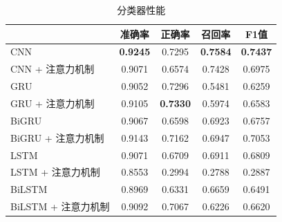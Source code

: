\begin{table}[htb]
  \centering
  \begin{minipage}[t]{0.8\linewidth}
  \caption{分类器性能}
  \label{tab:exp_context_emo_0_result}
    \begin{tabularx}{\linewidth}{X|cccc}
    \toprule[1.5pt]
    & 准确率 & 正确率 & 召回率 & F1值 \\
    \hline
    CNN & \bf 0.9245 & 0.7295 & \bf 0.7584 & \bf 0.7437 \\ %
    CNN + 注意力机制 & 0.9071 & 0.6574 & 0.7428 & 0.6975 \\ %
    \hline
    GRU & 0.9052 & 0.7296 & 0.5481 & 0.6259 \\ %
    GRU + 注意力机制 & 0.9105 & \bf 0.7330 & 0.5974 & 0.6583 \\ %
    \hline
    BiGRU & 0.9067 & 0.6598 & 0.6923 & 0.6757 \\ %
    BiGRU + 注意力机制 & 0.9143 & 0.7162 & 0.6947 & 0.7053 \\ %
    \hline
    LSTM & 0.9071 & 0.6709 & 0.6911 & 0.6809 \\ %
    LSTM + 注意力机制 & 0.8553 & 0.2994 & 0.2788 & 0.2887 \\ %
    \hline
    BiLSTM & 0.8969 & 0.6331 & 0.6659 & 0.6491 \\ %
    BiLSTM + 注意力机制 & 0.9092 & 0.7067 & 0.6226 & 0.6620 \\ %
    \bottomrule[1.5pt]
    \end{tabularx}
  \end{minipage}
\end{table}

